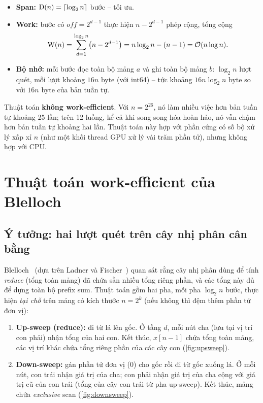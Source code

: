 \begin{itemize}
  \item \textbf{Span:} \(\mathrm{D}(n) = \lceil\log_2 n\rceil\) bước -- tối ưu.
  \item \textbf{Work:} bước có \(\mathit{off} = 2^{d-1}\) thực hiện \(n - 2^{d-1}\) phép cộng,
        tổng cộng
        \[
          \mathrm{W}(n) = \sum_{d=1}^{\log_2 n} \bigl(n - 2^{d-1}\bigr) = n\log_2 n - (n - 1)
          = \mathcal{O}(n \log n).
        \]
  \item \textbf{Bộ nhớ:} mỗi bước đọc toàn bộ mảng \(a\) và ghi toàn bộ mảng \(b\):
        \(\log_2 n\) lượt quét, mỗi lượt khoảng \(16n\) byte (với int64) -- tức khoảng
        \(16 n \log_2 n\) byte so với \(16n\) byte của bản tuần tự.
\end{itemize}
Thuật toán \textbf{không work-efficient}. Với \(n = 2^{26}\), nó làm nhiều việc hơn bản tuần tự
khoảng 25 lần; trên 12 luồng, kể cả khi song song hóa hoàn hảo, nó vẫn chậm hơn bản tuần tự
khoảng hai lần. Thuật toán này hợp với phần cứng có số bộ xử lý xấp xỉ \(n\) (như một khối
thread GPU xử lý vài trăm phần tử), nhưng không hợp với CPU.

\section{Thuật toán work-efficient của Blelloch}
\label{sec:alg-blelloch}

\subsection{Ý tưởng: hai lượt quét trên cây nhị phân cân bằng}

Blelloch~\cite{blelloch1990} (dựa trên Ladner và Fischer~\cite{ladner1980}) quan sát rằng cây
nhị phân dùng để tính \emph{reduce} (tổng toàn mảng) đã chứa sẵn nhiều tổng riêng phần, và các
tổng này đủ để dựng toàn bộ prefix sum. Thuật toán gồm hai pha, mỗi pha \(\log_2 n\) bước, thực
hiện \emph{tại chỗ} trên mảng có kích thước \(n = 2^k\) (nếu không thì đệm thêm phần tử đơn vị):

\begin{enumerate}
  \item \textbf{Up-sweep (reduce):} đi từ lá lên gốc. Ở tầng \(d\), mỗi nút cha (lưu tại vị trí
        con phải) nhận tổng của hai con. Kết thúc, \(x[n-1]\) chứa tổng toàn mảng, các vị trí
        khác chứa tổng riêng phần của các cây con (\cref{fig:upsweep}).
  \item \textbf{Down-sweep:} gán phần tử đơn vị (0) cho gốc rồi đi từ gốc xuống lá. Ở mỗi nút,
        con trái nhận giá trị của cha; con phải nhận giá trị của cha cộng với giá trị cũ của con
        trái (tổng của cây con trái từ pha up-sweep). Kết thúc, mảng chứa \emph{exclusive} scan
        (\cref{fig:downsweep}).
\end{enumerate}


